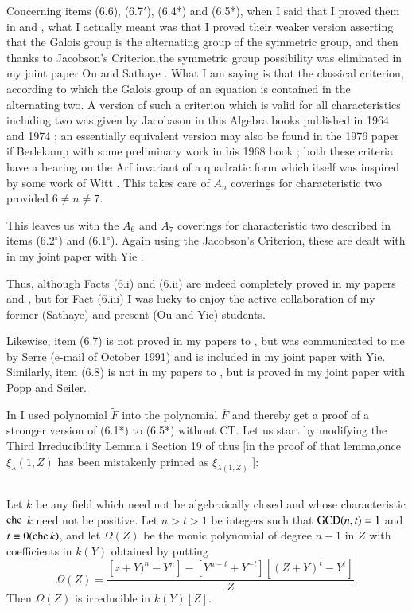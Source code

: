 Concerning items (6.6), (6.7$'$), (6.4*) and (6.5*), when I said that I proved them in \cite{chap1-key8} and \cite{chap1-key10}, what I actually meant was that I proved their weaker version asserting that the Galois group is the alternating group of the symmetric group, and then thanks to Jacobson's Criterion,the symmetric group possibility was eliminated in my joint paper Ou and Sathaye \cite{chap1-key14}. What I am saying is that the classical criterion, according to which the Galois group of an equation is contained in the alternating two. A version of such a criterion which is valid for all characteristics including two was given by Jacobason in this Algebra books published in 1964 \cite{chap1-key37} and 1974 \cite{chap1-key38}; an essentially equivalent version may also be found in the 1976 paper \cite{chap1-key20} if Berlekamp with some preliminary work in his 1968 book \cite{chap1-key19}; both these criteria have a bearing on the Arf invariant of a quadratic form \cite{chap1-key18} which itself was inspired by some work of Witt \cite{chap1-key61}. This takes care of $A_{n}$ coverings for characteristic two provided $ 6 \neq n \neq 7$. 

This leaves us with the $A_{6}$ and $A_{7}$ coverings for characteristic two described in items (6.2$^\circ$) and (6.1$^\circ$). Again using the Jacobson's Criterion, these are dealt with in my joint paper with Yie \cite{chap1-key17}.

Thus, although Facts (6.i) and (6.ii) are indeed completely proved in my papers \cite{chap1-key8} and \cite{chap1-key10}, but for Fact (6.iii) I was lucky to enjoy the active collaboration of my former (Sathaye) and present (Ou and Yie) students.

Likewise, item (6.7) is not proved in my papers \cite{chap1-key8} to \cite{chap1-key10}, but was communicated to me by Serre (e-mail of October 1991) and is included in my joint paper \cite{chap1-key17} with Yie. Similarly, item (6.8) is not in my papers \cite{chap1-key8} to \cite{chap1-key10}, but is proved in my joint paper \cite{chap1-key15} with Popp and Seiler.

In \cite{chap1-key8} I used polynomial $\widetilde{F}$ into the polynomial  $\overline{F}$ and thereby get a proof of a stronger version of (6.1*) to (6.5*) without CT. Let us start by modifying the Third Irreducibility Lemma i Section 19 of \cite{chap1-key8} thus [in the proof of that lemma,once $\xi_{\lambda}(1, Z)$ has been mistakenly printed as $\xi_{\lambda(1, Z)}$ ]:

\subsection{}\label{chap1-sec7.1}
Let $k$ be any field which need not be algebraically closed and whose characteristic $\operatorname{chc}$ $k$ need not be positive. Let $n > t > 1$ be integers such that $\operatorname{GCD}(n,t)=1$ and $t\equiv 0(\operatorname{chc} k)$, and let $\Omega(Z)$ be the monic polynomial of degree $n-1$ in $Z$ with coefficients in $k(Y)$ obtained by putting
$$
\Omega(Z)= \dfrac{\left[z+Y)^{n}-Y^{n}\right]-\left[Y^{n-t}+Y^{-t}\right]\left[(Z+Y)^{t}-Y^{t}\right]}{Z}.   
$$
Then $\Omega(Z)$ is irreducible in $k(Y)[Z]$.

